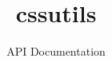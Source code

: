 \documentclass{article}
\begin{document}



\title{cssutils}
\author{API Documentation}
\maketitle


\addtolength{\parskip}{-2ex}
\tableofcontents
\addtolength{\parskip}{2ex}

\end{document}

